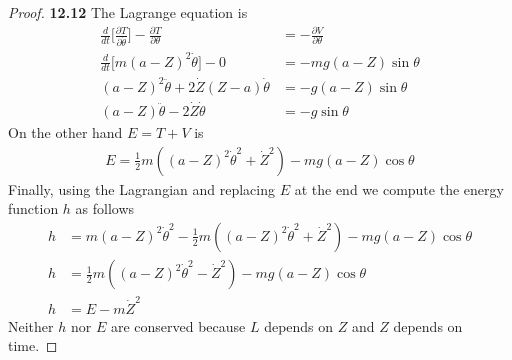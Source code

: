 \documentclass[11pt]{article}
\theoremstyle{definition}
\begin{document}
\begin{proof}{\textbf{12.12}}
    The Lagrange equation is
    \begin{align*}
        \frac{d}{dt}\bigg[\frac{\partial T}{\partial \dot{\theta}}\bigg] - 
        \frac{\partial T}{\partial \theta}
        &= -\frac{\partial V}{\partial \theta}\\
        \frac{d}{dt}\bigg[
            m(a - Z)^2\dot{\theta}
        \bigg] - 0
        &= - mg(a-Z)\sin\theta\\
        (a - Z)^2\ddot{\theta}
        + 2\dot{Z}(Z - a)\dot{\theta}
        &= - g(a-Z)\sin\theta\\
        (a - Z)\ddot{\theta}
        - 2\dot{Z}\dot{\theta}
        &= - g\sin\theta
    \end{align*}
    On the other hand $E = T + V$ is
    \begin{align*}
        E = \frac{1}{2}m((a - Z)^2\dot{\theta}^2
        + \dot{Z}^2)
        - mg(a - Z)\cos\theta
    \end{align*}
    Finally, using the Lagrangian and replacing $E$ at the end we compute
    the energy function $h$ as follows
    \begin{align*}
        h &= m(a - Z)^2\dot{\theta}^2
        - \frac{1}{2}m((a - Z)^2\dot{\theta}^2
        + \dot{Z}^2)
        - mg(a - Z)\cos\theta\\
        h &= \frac{1}{2}m((a - Z)^2\dot{\theta}^2
        - \dot{Z}^2)
        - mg(a - Z)\cos\theta\\
        h &= E - m\dot{Z}^2
    \end{align*}
    Neither $h$ nor $E$ are conserved because $L$ depends on $Z$ and $Z$
    depends on time.
\end{proof}
\end{document}
